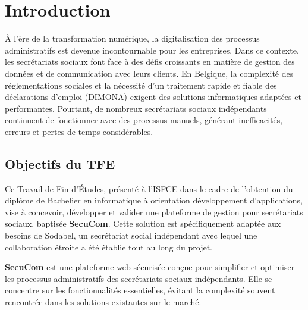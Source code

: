 \chapter*{Introduction}

À l'ère de la transformation numérique, la digitalisation des processus administratifs est devenue incontournable pour les entreprises. Dans ce contexte, les secrétariats sociaux font face à des défis croissants en matière de gestion des données et de communication avec leurs clients. En Belgique, la complexité des réglementations sociales et la nécessité d'un traitement rapide et fiable des déclarations d'emploi (DIMONA) exigent des solutions informatiques adaptées et performantes. Pourtant, de nombreux secrétariats sociaux indépendants continuent de fonctionner avec des processus manuels, générant inefficacités, erreurs et pertes de temps considérables.

\section*{Objectifs du TFE}

Ce Travail de Fin d'Études, présenté à l'ISFCE dans le cadre de l'obtention du diplôme de Bachelier en informatique à orientation développement d'applications, vise à concevoir, développer et valider une plateforme de gestion pour secrétariats sociaux, baptisée \textbf{SecuCom}. Cette solution est spécifiquement adaptée aux besoins de Sodabel, un secrétariat social indépendant avec lequel une collaboration étroite a été établie tout au long du projet.

\vspace{0.5cm}

\begin{tcolorbox}[
  title={\textbf{SecuCom}},
  colback=blue!5!white,
  colframe=primarycolor,
  fonttitle=\bfseries,
  boxrule=0.5mm,
  arc=2mm,
  left=6mm,
  right=6mm,
  top=6mm,
  bottom=6mm
]\textbf{SecuCom} est une plateforme web sécurisée conçue pour simplifier et optimiser les processus administratifs des secrétariats sociaux indépendants. Elle se concentre sur les fonctionnalités essentielles, évitant la complexité souvent rencontrée dans les solutions existantes sur le marché.
\end{tcolorbox}

\vspace{0.5cm}


